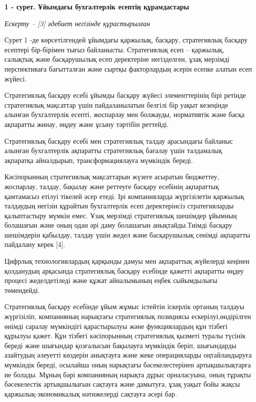 {\bfseries 1 - сурет. Ұйымдағы бухгалтерлік есептің құрамдастары}

\emph{Ескерту -- {[}3{]} әдебиет негізінде құрастырылған}

\begin{multicols}{2}
Сурет 1 -де көрсетілгендей ұйымдағы қаржылық, басқару, стратегиялық
басқару есептері бір-бірімен тығыз байланысты. Стратегиялық есеп --
қаржылық, салықтық және басқарушылық есеп деректеріне негізделген, ұзақ
мерзімді перспективаға бағытталған және сыртқы факторлардың әсерін
есепке алатын есеп жүйесі.

Стратегиялық басқару есебі ұйымды басқару жүйесі элементтерінің бірі
ретінде стратегиялық мақсаттар үшін пайдаланылатын белгілі бір уақыт
кезеңінде алынған бухгалтерлік есепті, жоспарлау мен болжауды,
нормативтік және басқа ақпаратты жинау, өңдеу және ұсыну тәртібін
реттейді.

Стратегиялық басқару есебі мен стратегиялық талдау арасындағы байланыс
алынған бухгалтерлік ақпаратты стратегиялық бағалау үшін талдамалық
ақпаратқа айналдырып, трансформациялауға мүмкіндік береді.

Кәсіпорынның стратегиялық мақсаттарын жүзеге асыратын бюджеттеу,
жоспарлау, талдау, бақылау және реттеуге басқару есебінің ақпараттық
қамтамасыз етілуі тікелей әсер етеді. Ірі компанияларда жүргізілетін
қаржылық талдаудың негізін құрайтын бухгалтерлік есеп деректерінсіз
стратегияларды қалыптастыру мүмкін емес. Ұзақ мерзімді стратегиялық
шешімдер ұйымның болашағын және оның одан әрі даму болашағын
анықтайды.Тиімді басқару шешімдерін қабылдау, талдау үшін жедел және
басқарушылық сенімді ақпаратты пайдалану керек {[}4{]}.

Цифрлық технологиялардың қарқынды дамуы мен ақпараттық жүйелерді кеңінен
қолданудың арқасында стратегиялық басқару есебінде қажетті ақпаратты
өңдеу процесі жеделдетіледі және құжат айналымының еңбек сыйымдылығы
төмендейді.

Стратегиялық басқару есебінде ұйым жұмыс істейтін іскерлік ортаның
талдауы жүргізіліп, компанияның нарықтағы стратегиялық позициясы
ескерілуі,өндірілген өнімді саралау мүмкіндігі қарастырылуы және
функциялардың құн тізбегі құрылуы қажет. Құн тізбегі кәсіпорынның
стратегиялық қызметі туралы түсінік береді және шығындар қозғалысын
бақылауға мүмкіндік беріп, шығындарды азайтудың әлеуетті көздерін
анықтауға және жеке операцияларды оңтайландыруға мүмкіндік береді,
осылайша оның нарықтағы бәсекелестерінен артықшылықтарға ие болады.
Мұның бәрі компанияның нарықта дұрыс орналасуына, оның тұрақты
бәсекелестік артықшылығын сақтауға және дамытуға, ұзақ уақыт бойы жақсы
қаржылық-экономикалық нәтижелерді сақтауға әсері бар.


\end{multicols}
